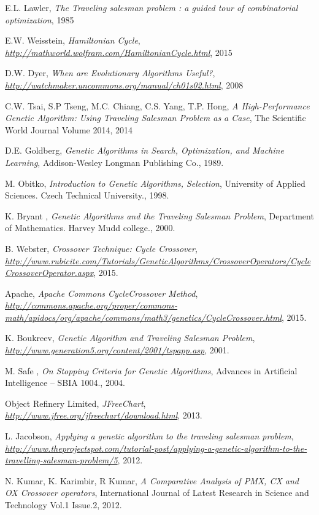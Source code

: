 \documentclass[article]{IEEEtran}
\begin{document}
\begin{thebibliography}{9}

E.L. Lawler, \textit{The Traveling salesman problem : a guided tour of combinatorial optimization},
1985

E.W. Weisstein, \textit{Hamiltonian Cycle},
\textit{\url{http://mathworld.wolfram.com/HamiltonianCycle.html}}, 2015

D.W. Dyer, \textit{When are Evolutionary Algorithms Useful?},
\textit{\url{http://watchmaker.uncommons.org/manual/ch01s02.html}}, 2008

C.W. Tsai, S.P Tseng, M.C. Chiang, C.S. Yang, T.P. Hong, \textit{A High-Performance Genetic Algorithm: Using Traveling Salesman Problem as a Case},
The Scientific World Journal Volume 2014, 2014

D.E. Goldberg, \textit{Genetic Algorithms in Search, Optimization, and Machine Learning},
Addison-Wesley Longman Publishing Co., 1989. 

M. Obitko, \textit{Introduction to Genetic Algorithms, Selection},
University of Applied Sciences. Czech Technical University., 1998. 

K. Bryant , \textit{Genetic Algorithms and the Traveling Salesman Problem},
Department of Mathematics. Harvey Mudd college., 2000. 

B. Webster, \textit{Crossover Technique: Cycle Crossover},
\textit{\url{http://www.rubicite.com/Tutorials/GeneticAlgorithms/CrossoverOperators/CycleCrossoverOperator.aspx}}, 2015.

Apache, \textit{Apache Commons CycleCrossover Method},
\textit{\url{http://commons.apache.org/proper/commons-math/apidocs/org/apache/commons/math3/genetics/CycleCrossover.html}}, 2015.

K. Boukreev, \textit{Genetic Algorithm and Traveling Salesman Problem},
\textit{\url{http://www.generation5.org/content/2001/tspapp.asp}}, 2001.

M. Safe , \textit{On Stopping Criteria for Genetic Algorithms},
Advances in Artificial Intelligence – SBIA 1004., 2004. 

Object Refinery Limited, \textit{JFreeChart},
\textit{\url{http://www.jfree.org/jfreechart/download.html}}, 2013.

L. Jacobson, \textit{Applying a genetic algorithm to the traveling salesman problem},
\textit{\url{http://www.theprojectspot.com/tutorial-post/applying-a-genetic-algorithm-to-the-travelling-salesman-problem/5}}, 2012.

N. Kumar, K. Karimbir, R Kumar, \textit{A Comparative Analysis of PMX, CX and OX Crossover operators},
International Journal of Latest Research in Science and Technology Vol.1 Issue.2, 2012.

\end{thebibliography}
\end{document}
